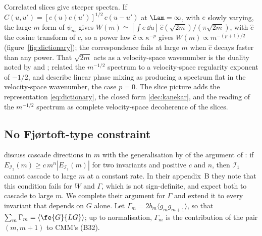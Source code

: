 Correlated slices give steeper spectra. If $C(u,u')=[e(u)e(u')]^{1/2}\,c(u-u')$ at $\Lam=\infty$, with $e$ slowly varying, the large-$m$ form of $\psi_m$ gives $W(m)\simeq[\int e\,\dd u]\,\hat c(\sqrt{2m})/(\pi\sqrt{2m})$, with $\hat c$ the cosine transform of $c$, so a power law $\hat c\propto\kappa^{-p}$ gives $W(m)\propto m^{-(p+1)/2}$ (figure~\ref{fig:dictionary}); the correspondence fails at large $m$ when $\hat c$ decays faster than any power. That $\sqrt{2m}$ acts as a velocity-space wavenumber is the duality noted by \citet{Schekochihin2016} and \citet{AdkinsSchekochihin2018}; \citet[note~81]{Eyink2018} related the $m^{-1/2}$ spectrum to a velocity-space regularity exponent of $-1/2$, and \citet{Nastac2024} describe linear phase mixing as producing a spectrum flat in the velocity-space wavenumber, the case $p=0$. The slice picture adds the representation \eqref{eq:dictionary}, the closed form \eqref{dec:kanekar}, and the reading of the $m^{-1/2}$ spectrum as complete velocity-space decoherence of the slices.

\subsection{No Fj{\o}rtoft-type constraint}\label{dec:sec-fjortoft}

\citet[section~4.1]{Chandran2026} discuss cascade directions in $m$ with the generalisation by \citet{AlexakisBiferale2018} of the argument of \citet{Fjortoft1953}: if $E_{\mathcal I_2}(m)\ge c\,m^n|E_{\mathcal I_1}(m)|$ for two invariants and positive $c$ and $n$, then $\mathcal I_1$ cannot cascade to large $m$ at a constant rate. In their appendix~B they note that this condition fails for $W$ and $\Gamma$, which is not sign-definite, and expect both to cascade to large $m$. We complete their argument for $\Gamma$ and extend it to every invariant that depends on $G$ alone. Let $\Gamma_m=2b_m\langle g_mg_{m+1}\rangle$, so that $\sum_m\Gamma_m=\langle\fe{G}{LG}\rangle$; up to normalisation, $\Gamma_m$ is the contribution of the pair $(m,m+1)$ to CMM's (B32).

